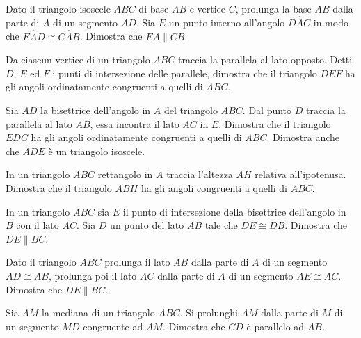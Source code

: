 \begin{multicols}{2}
\begin{esercizio}
\label{ese:3.29}
Dato il triangolo isoscele $ABC$ di base $AB$ e vertice $C$, prolunga 
la base $AB$ dalla parte di $A$ di un segmento $AD$. Sia $E$ un punto 
interno all'angolo $D\widehat{A}C$ in modo che $E\widehat{A}D\cong 
C\widehat{A}B$. Dimostra che $EA\parallel CB$.
\end{esercizio}

\begin{esercizio}
\label{ese:3.30}
Da ciascun vertice di un triangolo $ABC$ traccia la parallela al lato 
opposto. Detti $D$, $E$ ed $F$ i punti di intersezione delle 
parallele, dimostra che il triangolo $DEF$ ha gli angoli 
ordinatamente congruenti a quelli di $ABC$.
\end{esercizio}

\begin{esercizio}
\label{ese:3.31}
Sia $AD$ la bisettrice dell'angolo in $A$ del triangolo $ABC$. Dal 
punto $D$ traccia la parallela al lato $AB$, essa incontra il lato 
$AC$ in $E$. Dimostra che il triangolo $EDC$ ha gli angoli 
ordinatamente congruenti a quelli di $ABC$. Dimostra anche che $ADE$ 
è un triangolo isoscele.
\end{esercizio}

\begin{esercizio}
\label{ese:3.32}
In un triangolo $ABC$ rettangolo in $A$ traccia l'altezza $AH$ 
relativa all'ipotenusa. Dimostra che il triangolo $ABH$ ha gli angoli 
congruenti a quelli di $ABC$.
\end{esercizio}

\begin{esercizio}
\label{ese:3.35}
In un triangolo $ABC$ sia $E$ il punto di intersezione della 
bisettrice dell'angolo in $B$ con il lato $AC$. Sia $D$ un punto del 
lato $AB$ tale che $DE\cong DB$. Dimostra che $DE\parallel BC$.
\end{esercizio}

\begin{esercizio}
\label{ese:3.37}
Dato il triangolo $ABC$ prolunga il lato $AB$ dalla parte di $A$ di 
un segmento $AD\cong AB$, prolunga poi il lato $AC$ dalla parte di $A$ 
di un segmento $AE\cong AC$. Dimostra che $DE\parallel BC$.
\end{esercizio}

\begin{esercizio}
\label{ese:3.38}
Sia $AM$ la mediana di un triangolo $ABC$. Si prolunghi $AM$ dalla 
parte di $M$ di un segmento $MD$ congruente ad $AM$. Dimostra che 
$CD$ è parallelo ad $AB$.
\end{esercizio}



\end{multicols}
